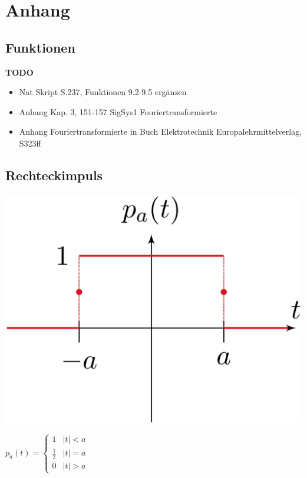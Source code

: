 \section{Anhang}
	\subsection{Funktionen}
	
	\textbf{TODO}
		\begin{itemize}
				\item Nat Skript S.237, Funktionen 9.2-9.5 ergänzen
				\item Anhang Kap. 3, 151-157 SigSys1 Fouriertransformierte
				\item Anhang Fouriertransformierte in Buch Elektrotechnik Europalehrmittelverlag, S323ff
		\end{itemize}
	
	
		\subsection{Rechteckimpuls}
		\begin{minipage}{0.2\textwidth}
			\includegraphics[width=\textwidth]{./bilder/funktionen/rechteckF.png}
		\end{minipage}
		\qquad
		\begin{minipage}{0.45\textwidth}
			$p_{a}(t)=\begin{cases}
			1 & |t|<a \\ 
			\frac{1}{2} & |t|=a \\ 
			0 & |t|>a
			\end{cases}$
		\end{minipage}
		\qquad
		\begin{minipage}{0.25\textwidth}						
		\end{minipage}
		
